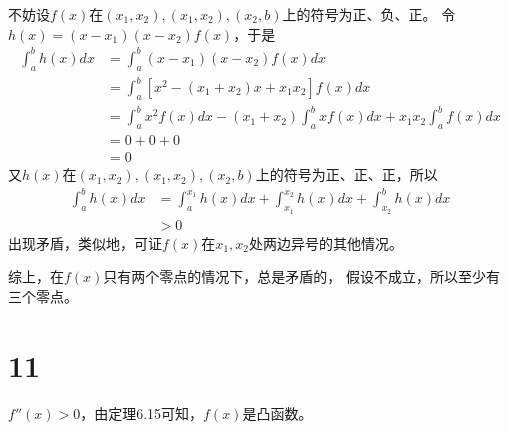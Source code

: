 \documentclass{article}
\begin{document}
不妨设$f(x)$在$(x_1, x_2), (x_1, x_2), (x_2, b)$上的符号为正、负、正。
令$h(x) = (x - x_1)(x - x_2)f(x)$，于是
\begin{align*}
  \int_{a}^{b} h(x) dx
   & = \int_{a}^{b} (x - x_1)(x - x_2)f(x) dx                                                      \\
   & = \int_{a}^{b} [x^2 - (x_1 + x_2)x + x_1x_2] f(x) dx                                          \\
   & = \int_{a}^{b} x^2 f(x) dx - (x_1 + x_2) \int_{a}^{b} x f(x) dx + x_1x_2 \int_{a}^{b} f(x) dx \\
   & = 0 + 0 + 0                                                                                   \\
   & = 0
\end{align*}
又$h(x)$在$(x_1, x_2), (x_1, x_2), (x_2, b)$上的符号为正、正、正，所以
\begin{align*}
  \int_{a}^{b} h(x) dx
   & = \int_{a}^{x_1} h(x) dx + \int_{x_1}^{x_2} h(x) dx + \int_{x_2}^{b} h(x) dx \\
   & > 0
\end{align*}
出现矛盾，类似地，可证$f(x)$在$x_1, x_2$处两边异号的其他情况。

综上，在$f(x)$只有两个零点的情况下，总是矛盾的，
假设不成立，所以至少有三个零点。

\section*{11}

$f''(x) > 0$，由定理6.15可知，$f(x)$是凸函数。
\end{document}
